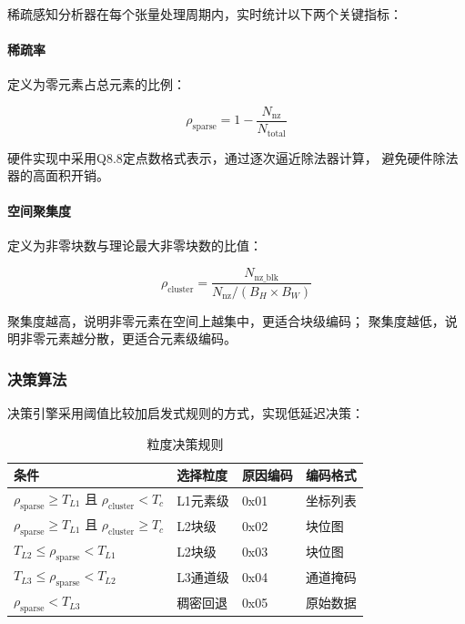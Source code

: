 \documentclass[a4paper,12pt,fontset=ubuntu]{ctexart}
\begin{document}
稀疏感知分析器在每个张量处理周期内，实时统计以下两个关键指标：

\paragraph{稀疏率}定义为零元素占总元素的比例：

\begin{equation}
\rho_{\text{sparse}} = 1 - \frac{N_{\text{nz}}}{N_{\text{total}}}
\end{equation}

硬件实现中采用Q8.8定点数格式表示，通过逐次逼近除法器计算，
避免硬件除法器的高面积开销。

\paragraph{空间聚集度}定义为非零块数与理论最大非零块数的比值：

\begin{equation}
\rho_{\text{cluster}} = \frac{N_{\text{nz\_blk}}}{N_{\text{nz}} / (B_H \times B_W)}
\end{equation}

聚集度越高，说明非零元素在空间上越集中，更适合块级编码；
聚集度越低，说明非零元素越分散，更适合元素级编码。

\subsubsection{决策算法}

决策引擎采用阈值比较加启发式规则的方式，实现低延迟决策：

\begin{table}[htbp]
\centering
\caption{粒度决策规则}
\begin{tabular}{llll}
\toprule
\textbf{条件} & \textbf{选择粒度} & \textbf{原因编码} & \textbf{编码格式} \\
\midrule
$\rho_{\text{sparse}} \geq T_{L1}$ 且 $\rho_{\text{cluster}} < T_c$ & L1元素级 & 0x01 & 坐标列表 \\
$\rho_{\text{sparse}} \geq T_{L1}$ 且 $\rho_{\text{cluster}} \geq T_c$ & L2块级 & 0x02 & 块位图 \\
$T_{L2} \leq \rho_{\text{sparse}} < T_{L1}$ & L2块级 & 0x03 & 块位图 \\
$T_{L3} \leq \rho_{\text{sparse}} < T_{L2}$ & L3通道级 & 0x04 & 通道掩码 \\
$\rho_{\text{sparse}} < T_{L3}$ & 稠密回退 & 0x05 & 原始数据 \\
\bottomrule
\end{tabular}
\end{table}
\end{document}

